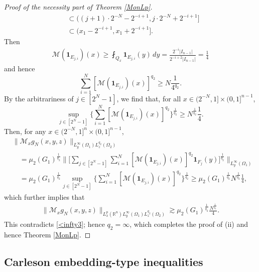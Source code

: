 \documentclass[11pt, reqno]{amsart}
\theoremstyle{definition}
\theoremstyle{remark}
\numberwithin{equation}{section}
\newcommand{\one}{\mathbf{1}}
\begin{document}
\begin{proof}[Proof of the necessity part of Theorem \ref{MonLp}]
\begin{align*}
&\subset ((j+1)\cdot 2^{-N}-2^{-i+1}, j\cdot 2^{-N}+2^{-i+1}]\\
&\subset (x_1-2^{-i+1}, x_1+2^{-i+1}].
\end{align*}
Then
\begin{align*}
\mathcal M(\mathbf{1}_{E_{j,i}})(x)
\geq \fint_{Q_x} \mathbf{1}_{E_{j,i}}(y)\,dy
=\frac{2^{-i}|I_{n-1}|}{2^{-i+2}|I_{n-1}|}
=\frac14
\end{align*}
and hence
\begin{equation*}
\sum_{i=1}^N [\mathcal M(\one_{E_{j,i}})(x)]^{q_2}
\geq N\frac 1{4^{q_2}}.
\end{equation*}
By the arbitrariness of $j\in [2^N-1]$,
we find that, for all $x\in(2^{-N},1]\times (0,1]^{n-1}$,
\begin{equation*}
\sup_{j\in[2^N-1]}\Bigg\{\sum_{i=1}^N [\mathcal M(\one_{E_{j,i}})(x)]^{q_2}\Bigg\}^{\frac{1}{q_2}}
\geq N^{\frac{1}{q_2}}\frac 14.
\end{equation*}
Then, for any $x\in(2^{-N},1]^n\times (0,1]^{n-1}$,
\begin{align*}
&\|\mathcal M_xg_N(x,y,z)\|_{L^{\infty}_y(\Omega_1)L^{q_2}_z(\Omega_2)}\\
&\quad=\mu_2(G_1)^{\frac1{q_2}}
\Bigg\|\Bigg[\sum_{j\in [2^N-1]}\sum_{i=1}^N
[\mathcal M(\mathbf{1}_{E_{j,i}})(x)]^{q_2}
\mathbf{1}_{F_j}(y)\Bigg]^{\frac1{q_2}}
\Bigg\|_{L^\infty_y(\Omega_1)}\\
&\quad=\mu_2(G_1)^{\frac{1}{q_2}}
\sup_{j\in [2^N-1]} \Bigg\{ \sum_{i=1}^N [\mathcal M(\one_{E_{j,i}})(x)]^{q_2}\Bigg\}^{\frac{1}{q_2}}
\geq\mu_2(G_1)^{\frac1{q_2}} N^{\frac{1}{q_2}} \frac 14,
\end{align*}
which further implies that
\begin{align*}
\|\mathcal M_xg_N(x,y,z)\|_{L^p_x(\mathbb R^n)L^{\infty}_y(\Omega_1)L^{q_2}_z(\Omega_2)}
\gtrsim \mu_2(G_1)^{\frac1{q_2}} \frac{N^{\frac{1}{q_2}}}4.
\end{align*}
This contradicts \eqref{<infty3}; hence $q_2=\infty$, which completes
the proof of (ii) and hence Theorem \ref{MonLp}.
\end{proof}

\subsection{Carleson embedding-type inequalities} \label{Carl}
\end{document}
